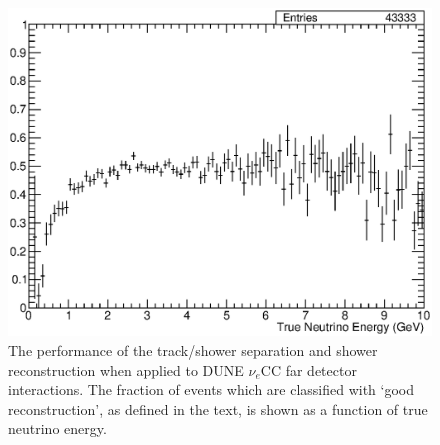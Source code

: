 \begin{figure}
  \centering
  \includegraphics[width=12cm]{GoodReconEnergy.eps}
  \caption[The performance of the track/shower separation and shower reconstruction when applied to DUNE $\nu_e$CC far detector interactions.]{The performance of the track/shower separation and shower reconstruction when applied to DUNE $\nu_e$CC far detector interactions.  The fraction of events which are classified with `good reconstruction', as defined in the text, is shown as a function of true neutrino energy.}
  \label{fig:GoodReconstruction}
\end{figure}
